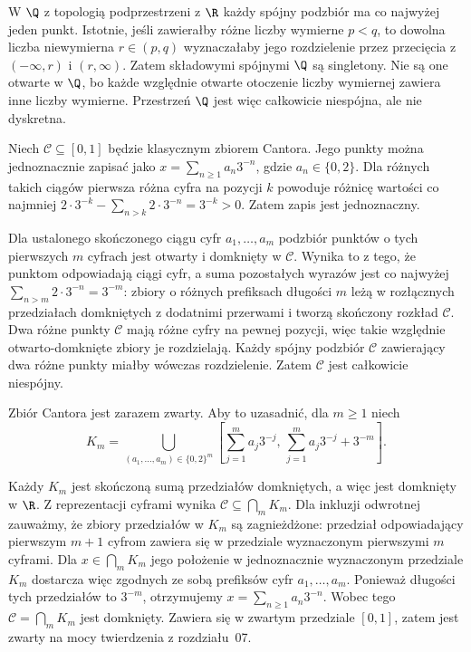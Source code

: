 \begin{przyklad}
\label{ex:topog-spojnosc-Q}
W $\Q$ z topologią podprzestrzeni z $\R$
każdy spójny podzbiór ma co najwyżej jeden
punkt. Istotnie, jeśli zawierałby różne
liczby wymierne $p<q$, to dowolna liczba
niewymierna $r\in(p,q)$ wyznaczałaby
jego rozdzielenie przez przecięcia z
$(-\infty,r)$ i $(r,\infty)$.
Zatem składowymi spójnymi $\Q$ są singletony.
Nie są one otwarte w $\Q$, bo każde
względnie otwarte otoczenie liczby wymiernej
zawiera inne liczby wymierne.
Przestrzeń $\Q$ jest więc całkowicie
niespójna, ale nie dyskretna.
\end{przyklad}

\begin{przyklad}
\label{ex:topog-spojnosc-cantor}
Niech $\mathcal C\subseteq[0,1]$ będzie klasycznym
zbiorem Cantora. Jego punkty można jednoznacznie
zapisać jako $x=\sum_{n\ge1}a_n3^{-n}$,
gdzie $a_n\in\{0,2\}$. Dla różnych takich
ciągów pierwsza różna cyfra na pozycji $k$
powoduje różnicę wartości co najmniej
$2\cdot3^{-k}-\sum_{n>k}2\cdot3^{-n}=3^{-k}>0$.
Zatem zapis jest jednoznaczny.

Dla ustalonego skończonego ciągu cyfr
$a_1,\ldots,a_m$ podzbiór punktów o tych
pierwszych $m$ cyfrach jest otwarty
i domknięty w $\mathcal C$. Wynika to z tego,
że punktom odpowiadają ciągi cyfr, a suma
pozostałych wyrazów jest co najwyżej
$\sum_{n>m}2\cdot3^{-n}=3^{-m}$:
zbiory o różnych prefiksach długości $m$
leżą w rozłącznych przedziałach domkniętych
z dodatnimi przerwami i tworzą skończony
rozkład $\mathcal C$. Dwa różne punkty
$\mathcal C$ mają różne cyfry na pewnej pozycji,
więc takie względnie otwarto-domknięte
zbiory je rozdzielają. Każdy spójny podzbiór
$\mathcal C$ zawierający dwa różne punkty
miałby wówczas rozdzielenie. Zatem
$\mathcal C$ jest całkowicie niespójny.

\begin{samepage}
Zbiór Cantora jest zarazem zwarty. Aby to
uzasadnić, dla $m\ge1$ niech
\[
K_m=\bigcup_{(a_1,\ldots,a_m)\in\{0,2\}^m}
\left[\sum_{j=1}^m a_j3^{-j},\,
\sum_{j=1}^m a_j3^{-j}+3^{-m}\right].
\]
\end{samepage}

Każdy $K_m$ jest skończoną sumą
przedziałów domkniętych, a więc jest
domknięty w $\R$. Z reprezentacji cyframi
wynika $\mathcal C\subseteq\bigcap_m K_m$.
Dla inkluzji odwrotnej zauważmy, że zbiory
przedziałów w $K_m$ są zagnieżdżone:
przedział odpowiadający pierwszym $m+1$
cyfrom zawiera się w przedziale wyznaczonym
pierwszymi $m$ cyframi. Dla
$x\in\bigcap_m K_m$ jego położenie
w jednoznacznie wyznaczonym przedziale
$K_m$ dostarcza więc zgodnych ze sobą
prefiksów cyfr $a_1,\ldots,a_m$.
Ponieważ długości tych przedziałów to $3^{-m}$,
otrzymujemy $x=\sum_{n\ge1}a_n3^{-n}$.
Wobec tego $\mathcal C=\bigcap_m K_m$
jest domknięty. Zawiera się w zwartym
przedziale $[0,1]$, zatem jest zwarty
na mocy twierdzenia z rozdziału~07.
\end{przyklad}

